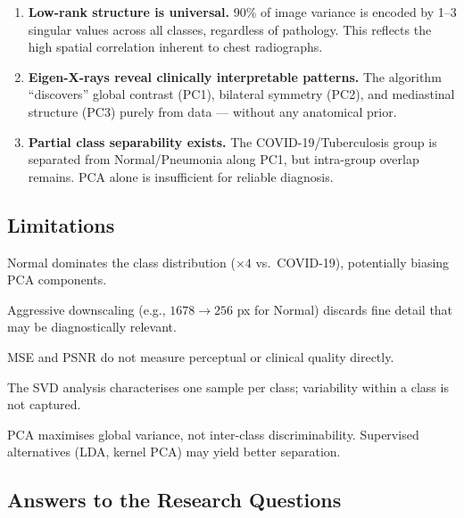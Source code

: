 \documentclass[11pt,a4paper]{article}
\theoremstyle{definition}
\begin{document}
\begin{enumerate}[nosep]
  \item \textbf{Low-rank structure is universal.} 90\% of image variance is encoded by 1--3 singular values across all classes, regardless of pathology. This reflects the high spatial correlation inherent to chest radiographs.
  \item \textbf{Eigen-X-rays reveal clinically interpretable patterns.} The algorithm ``discovers'' global contrast (PC1), bilateral symmetry (PC2), and mediastinal structure (PC3) purely from data --- without any anatomical prior.
  \item \textbf{Partial class separability exists.} The COVID-19/Tuberculosis group is separated from Normal/Pneumonia along PC1, but intra-group overlap remains. PCA alone is insufficient for reliable diagnosis.
\end{enumerate}

\subsection{Limitations}

\begin{description}[nosep, leftmargin=2em]
  \item[Imbalanced dataset.] Normal dominates the class distribution ($\times4$ vs.\ COVID-19), potentially biasing PCA components.
  \item[Heterogeneous resolution.] Aggressive downscaling (e.g., $1678 \to 256$ px for Normal) discards fine detail that may be diagnostically relevant.
  \item[Pixel-wise metrics.] MSE and PSNR do not measure perceptual or clinical quality directly.
  \item[Single-image SVD.] The SVD analysis characterises one sample per class; variability within a class is not captured.
  \item[Unsupervised PCA.] PCA maximises global variance, not inter-class discriminability. Supervised alternatives (LDA, kernel PCA) may yield better separation.
\end{description}

\subsection{Answers to the Research Questions}
\end{document}
